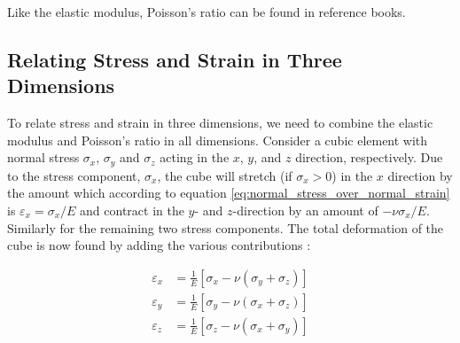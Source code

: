 Like the elastic modulus, Poisson's ratio can be found in reference
books.

\subsection{Relating Stress and Strain in Three Dimensions}
\label{sec:stress-strain-relation-in-3d}
To relate stress and strain in three dimensions, we need to combine
the elastic modulus and Poisson's ratio in all dimensions.
%
%
Consider a cubic element with normal stress $\sigma_x$, $\sigma_y$
and $\sigma_z$ acting in the $x$, $y$, and $z$ direction, respectively.
%
%
%
%
Due to the stress component, $\sigma_x$, the cube will stretch (if
$\sigma_x > 0$) in the $x$ direction by the amount which according to
equation \eqref{eq:normal_stress_over_normal_strain} is $\varepsilon_x
= \sigma_x / E$ and contract in the $y$- and $z$-direction by an amount of
$-\nu \sigma_x /E$. Similarly for the remaining two stress
components. The total deformation of the cube is now found by adding
the various contributions :

\begin{equation}
\label{eq:hookes-law-in-3d}
\begin{aligned}
    \varepsilon_x &= \frac {1}{E} \left [ \sigma_x - \nu \left (
        \sigma_y + \sigma_z \right ) \right ] \\
    \varepsilon_y &= \frac {1}{E} \left [ \sigma_y - \nu \left (
        \sigma_x + \sigma_z \right ) \right ] \\
    \varepsilon_z &= \frac {1}{E} \left [ \sigma_z - \nu \left (
        \sigma_x + \sigma_y \right ) \right ]  
\end{aligned}
\end{equation}

